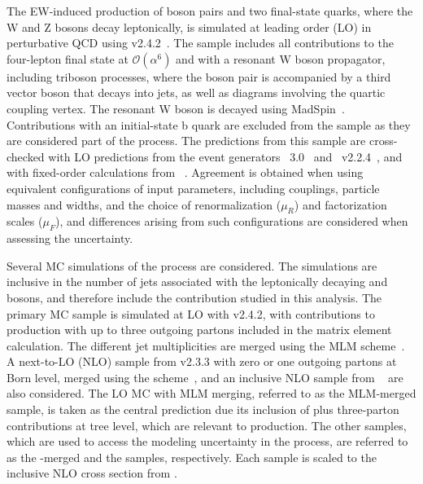 The EW-induced production of \WZ boson pairs and two final-state quarks, where the W and Z bosons decay leptonically, 
is simulated at leading order (LO) in perturbative QCD using 
\MG v2.4.2~\cite{MGatNLO}. 
The sample includes all contributions to the four-lepton final state at $\mathcal{O}(\alpha^6)$ and 
with a resonant W boson propagator, including
triboson processes, where the \WZ boson pair is accompanied by 
a third vector boson that decays into jets, as well as diagrams involving the quartic coupling vertex. 
The resonant W boson is decayed using {\sc MadSpin}~\cite{Artoisenet:2012st}.
Contributions with an initial-state b quark are excluded from the sample
as they are considered part of the \tZq process.
The predictions from this sample are cross-checked with LO predictions from the 
event generators \VBFNLO~3.0~\cite{VBFNLO} and 
\Sherpa~v2.2.4~\cite{Gleisberg:2008ta,Gleisberg:2003xi}, 
and with fixed-order calculations from
\Moca~\cite{leshouches2017,Recola}. Agreement is obtained when using equivalent configurations
of input parameters, including couplings, particle masses and widths, and the choice of
renormalization ($\mu_{R}$) and 
factorization scales ($\mu_{F}$),
and differences arising from such configurations are considered when assessing the uncertainty.

Several MC simulations of the \QCDWZ process are considered.
The simulations are inclusive in the number of jets associated with the 
leptonically decaying \PW and \cPZ bosons, and therefore include 
the \WZjj contribution studied in this analysis.
The primary MC sample is simulated at 
LO with \MG v2.4.2, with contributions to \WZ production with up to three outgoing partons 
included in the matrix element calculation. 
The different jet multiplicities are merged using the MLM scheme~\cite{MLMmerging}.
A next-to-LO (NLO) sample from \MG v2.3.3 
with zero or one outgoing partons at Born level, merged using the \FxFx scheme~\cite{Frederix:2012ps},
and an inclusive NLO sample from ~\cite{Melia:2011tj,Nason:2004rx,Frixione:2007vw,powheg:2010}
are also considered. 
The LO MC with MLM merging, referred to as the MLM-merged sample, 
is taken as the central prediction due its inclusion of
\WZ plus three-parton contributions at tree level, which are relevant
to \WZjj production.
The other samples,
which are used to access the modeling uncertainty in the \QCDWZ process,
are referred to as the \FxFx-merged
and the \POWHEG samples, respectively.
Each sample is scaled to the inclusive NLO cross section from .

